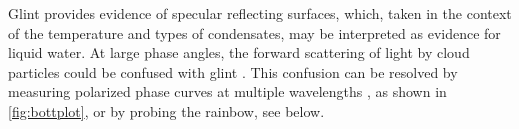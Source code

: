 \documentclass[usenatbib]{mnras}
\begin{document}
Glint provides evidence of specular reflecting surfaces, which, taken in the context of the temperature and types of condensates, may be interpreted as evidence for liquid water.
%
At large phase angles, the forward scattering of light by cloud particles could be confused with glint \citep{Robinson_2010}.
%
This confusion can be resolved by measuring polarized phase curves at multiple wavelengths
\citep{treesandstam2019}, as shown in \cref{fig:bottplot}, or by probing 
the rainbow, see below. %
%
\end{document}
